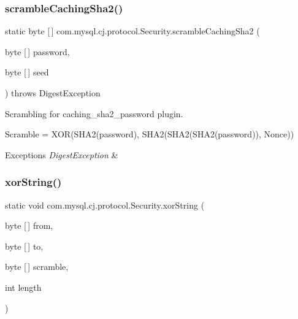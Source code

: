\subsubsection{\texorpdfstring{scramble\+Caching\+Sha2()}{scrambleCachingSha2()}}
{\footnotesize\ttfamily static byte \mbox{[}$\,$\mbox{]} com.\+mysql.\+cj.\+protocol.\+Security.\+scramble\+Caching\+Sha2 (\begin{DoxyParamCaption}\item[{byte \mbox{[}$\,$\mbox{]}}]{password,  }\item[{byte \mbox{[}$\,$\mbox{]}}]{seed }\end{DoxyParamCaption}) throws Digest\+Exception\hspace{0.3cm}{\ttfamily [static]}}

Scrambling for caching\+\_\+sha2\+\_\+password plugin.


\begin{DoxyPre}
Scramble = XOR(SHA2(password), SHA2(SHA2(SHA2(password)), Nonce))
\end{DoxyPre}



\begin{DoxyExceptions}{Exceptions}
{\em Digest\+Exception} & \\
\hline
\end{DoxyExceptions}
\mbox{\label{classcom_1_1mysql_1_1cj_1_1protocol_1_1_security_a6529697fb27ef62f6a21cb347f5e4c99}} 
\subsubsection{\texorpdfstring{xor\+String()}{xorString()}}
{\footnotesize\ttfamily static void com.\+mysql.\+cj.\+protocol.\+Security.\+xor\+String (\begin{DoxyParamCaption}\item[{byte \mbox{[}$\,$\mbox{]}}]{from,  }\item[{byte \mbox{[}$\,$\mbox{]}}]{to,  }\item[{byte \mbox{[}$\,$\mbox{]}}]{scramble,  }\item[{int}]{length }\end{DoxyParamCaption})\hspace{0.3cm}{\ttfamily [static]}}


